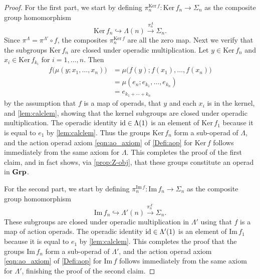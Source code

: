 \begin{proof}
For the first part, we start by defining $\pi_n^{\mathrm{Ker}\,f} \colon \mathrm{Ker}\,f_n \to \Sigma_n$ as the composite group homomorphism
\[
\mathrm{Ker}\,f_n \hookrightarrow \Lambda(n) \stackrel{\pi_n^{\Lambda}}{\to} \Sigma_n.
\]
Since $\pi^{\Lambda} = \pi^{\Lambda'} \circ f$, the composites $\pi_n^{\mathrm{Ker}\,f}$ are all the zero map.
Next we verify that the subgroups $\mathrm{Ker}\,f_n$ are closed under operadic multiplication. 
Let $y \in \mathrm{Ker}\,f_n$ and $x_i \in \mathrm{Ker}\,f_{k_i}$ for $i=1, \ldots, n$.
Then
\begin{align*}
f \big( \mu(y; x_1, \ldots, x_n) \big) & = \mu\big( f(y); f(x_1), \ldots, f(x_n) \big) \\
& = \mu(e_n; e_{k_1}, \ldots, e_{k_n} ) \\ 
& = e_{k_1 + \cdots + k_n}
\end{align*}
by the assumption that $f$ is a map of operads, that $y$ and each $x_i$ is in the kernel, and \cref{lem:calclem}, showing that the kernel subgroups are closed under operadic multiplication.
The operadic identity $\textrm{id} \in \Lambda(1)$ is an element of $\mathrm{Ker}\,f_1$ because it is equal to $e_1$ by \cref{lem:calclem}.
Thus the groups $\mathrm{Ker}\,f_n$ form a sub-operad of $\Lambda$, and the action operad axiom \cref{eqn:ao_axiom} of \cref{Defi:aop} for $\mathrm{Ker}\,f$ follows immediately from the same axiom for $\Lambda$.
This completes the proof of the first claim, and in fact shows, via \cref{prop:Z-obj}, that these groups constitute an operad in $\mathbf{Grp}$.

For the second part, we start by defining $\pi_n^{\mathrm{Im}\,f} \colon \mathrm{Im}\,f_n \to \Sigma_n$ as the composite group homomorphism
\[
\mathrm{Im}\,f_n \hookrightarrow \Lambda'(n) \stackrel{\pi_n^{\Lambda'}}{\to} \Sigma_n.
\]
These subgroups are closed under operadic multiplication in $\Lambda'$ using that $f$ is a map of action operads.
The operadic identity $\textrm{id} \in \Lambda'(1)$ is an element of $\mathrm{Im}\,f_1$ because it is equal to $e_1$ by \cref{lem:calclem}.
This completes the proof that the groups $\mathrm{Im}\,f_n$ form a sub-operad of $\Lambda'$, and the action operad axiom \cref{eqn:ao_axiom} of \cref{Defi:aop} for $\mathrm{Im}\,f$ follows immediately from the same axiom for $\Lambda'$, finishing the proof of the second claim.
\end{proof}


